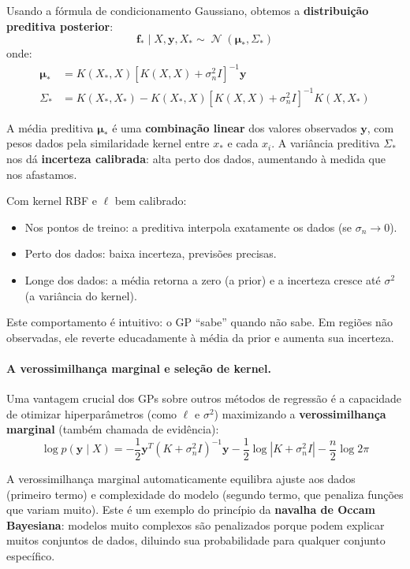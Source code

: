\documentclass{tufte-handout}
\DeclareMathOperator{\N}{\mathcal{N}}
\begin{document}
Usando a fórmula de condicionamento Gaussiano, obtemos a \textbf{distribuição preditiva posterior}:
\[
\mathbf{f}_* \mid X, \mathbf{y}, X_* \sim \N(\boldsymbol{\mu}_*, \Sigma_*)
\]
onde:
\begin{align*}
    \boldsymbol{\mu}_* &= K(X_*, X) [K(X, X) + \sigma_n^2 I]^{-1} \mathbf{y} \\
    \Sigma_* &= K(X_*, X_*) - K(X_*, X) [K(X, X) + \sigma_n^2 I]^{-1} K(X, X_*)
\end{align*}

A média preditiva $\boldsymbol{\mu}_*$ é uma \textbf{combinação linear} dos valores observados $\mathbf{y}$, com pesos dados pela similaridade kernel entre $x_*$ e cada $x_i$. A variância preditiva $\Sigma_*$ nos dá \textbf{incerteza calibrada}: alta perto dos dados, aumentando à medida que nos afastamos.

\begin{exmp}
    Com kernel RBF e $\ell$ bem calibrado:
    \begin{itemize}
        \item Nos pontos de treino: a preditiva interpola exatamente os dados (se $\sigma_n \to 0$).
        \item Perto dos dados: baixa incerteza, previsões precisas.
        \item Longe dos dados: a média retorna a zero (a prior) e a incerteza cresce até $\sigma^2$ (a variância do kernel).
    \end{itemize}
    Este comportamento é intuitivo: o GP ``sabe'' quando não sabe. Em regiões não observadas, ele reverte educadamente à média da prior e aumenta sua incerteza.
\end{exmp}

\paragraph{A verossimilhança marginal e seleção de kernel.}

Uma vantagem crucial dos GPs sobre outros métodos de regressão é a capacidade de otimizar hiperparâmetros (como $\ell$ e $\sigma^2$) maximizando a \textbf{verossimilhança marginal} (também chamada de evidência):
\[
\log p(\mathbf{y} \mid X) = -\frac{1}{2} \mathbf{y}^T (K + \sigma_n^2 I)^{-1} \mathbf{y} - \frac{1}{2} \log |K + \sigma_n^2 I| - \frac{n}{2} \log 2\pi
\]

A verossimilhança marginal automaticamente equilibra ajuste aos dados (primeiro termo) e complexidade do modelo (segundo termo, que penaliza funções que variam muito). Este é um exemplo do princípio da \textbf{navalha de Occam Bayesiana}: modelos muito complexos são penalizados porque podem explicar muitos conjuntos de dados, diluindo sua probabilidade para qualquer conjunto específico.
\end{document}
